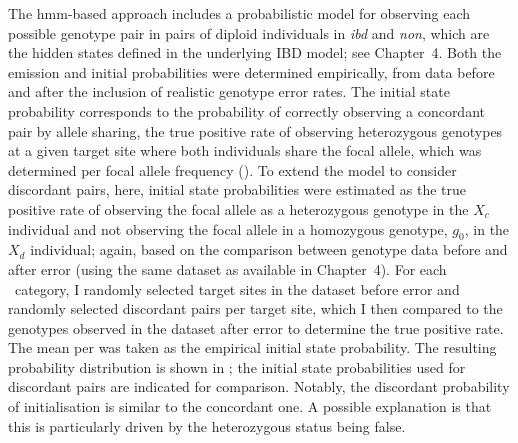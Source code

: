 The \gls{hmm}-based approach includes a probabilistic model for observing each possible genotype pair in pairs of diploid individuals in \emph{ibd} and \emph{non}, which are the hidden states defined in the underlying IBD model; see Chapter~4.
Both the emission and initial probabilities were determined empirically, from data before and after the inclusion of realistic genotype error rates.
The initial state probability corresponds to the probability of correctly observing a concordant pair by allele sharing, \ie the true positive rate of observing heterozygous genotypes at a given target site where both individuals share the focal allele, which was determined per focal allele frequency (\fk{}).
To extend the model to consider discordant pairs, here, initial state probabilities were estimated as the true positive rate of observing the focal allele as a heterozygous genotype in the $X_c$ individual and not observing the focal allele in a homozygous genotype, $g_0$, in the $X_d$ individual; again, based on the comparison between genotype data before and after error (using the same dataset as available in Chapter~4).
For each \fk{}~category, I randomly selected  target sites in the dataset before error and randomly selected  discordant pairs per target site, which I then compared to the genotypes observed in the dataset after error to determine the true positive rate.
The mean per \fk{} was taken as the empirical initial state probability.
The resulting probability distribution is shown in ; the initial state probabilities used for discordant pairs are indicated for comparison.
Notably, the discordant probability of initialisation is similar to the concordant one.
A possible explanation is that this is particularly driven by the heterozygous status being false.




